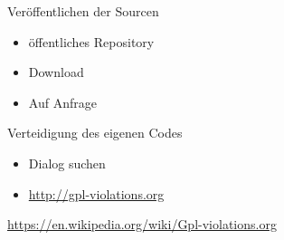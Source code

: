 \begin{frame}{Veröffentlichen der Sourcen}
	\begin{itemize}
		\item öffentliches Repository
		\item Download
		\item Auf Anfrage
	\end{itemize}
\end{frame}

\begin{frame}{Verteidigung des eigenen Codes}
	\begin{itemize}
		\item Dialog suchen
		\item \url{http://gpl-violations.org}
	\end{itemize}
\end{frame}
\note
{
  \url{https://en.wikipedia.org/wiki/Gpl-violations.org}
}
